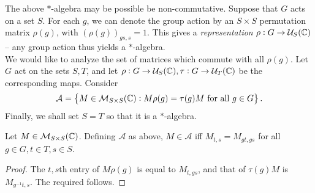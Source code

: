 	The above $*$-algebra may be possible be non-commutative. Suppose that $G$ acts on a set $S$. For each $g$, we can denote the group action by an $S \times S$ permutation matrix $\rho(g)$, with $(\rho(g))_{gs,s} = 1$. This gives a \emph{representation} $\rho : G \to \mathcal{U}_{S}(\mathbb{C})$ -- any group action thus yields a $*$-algebra.\\
	We would like to analyze the set of matrices which commute with all $\rho(g)$. Let $G$ act on the sets $S,T$, and let $\rho : G \to \mathcal{U}_S(\mathbb{C}), \tau : G \to \mathcal{U}_T(\mathbb{C})$ be the corresponding maps. Consider
	\[ \mathcal{A} = \left\{ M \in \mathcal{M}_{S \times S}(\mathbb{C}) : M \rho(g) = \tau(g) M \text{ for all $g \in G$} \right\}. \]
	Finally, we shall set $S = T$ so that it is a $*$-algebra.

	\begin{flem}
		Let $M \in \mathcal{M}_{S \times S}(\mathbb{C})$. Defining $\mathcal{A}$ as above, $M \in \mathcal{A}$ iff $M_{t,s} = M_{gt,gs}$ for all $g \in G, t \in T,s \in S$.
	\end{flem}
	\begin{proof}
		The $t,s$th entry of $M\rho(g)$ is equal to $M_{t,gs}$, and that of $\tau(g)M$ is $M_{g^{-1}t,s}$. The required follows.
	\end{proof}
